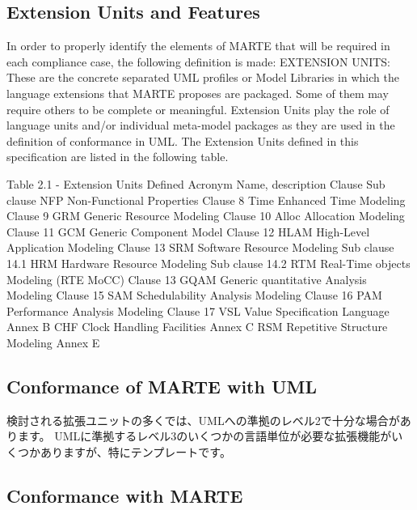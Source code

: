 \subsection{Extension Units and Features}

In order to properly identify the elements of MARTE that will be required in each compliance case, the following
definition is made:
EXTENSION UNITS: These are the concrete separated UML profiles or Model Libraries in which the language
extensions that MARTE proposes are packaged. Some of them may require others to be complete or meaningful.
Extension Units play the role of language units and/or individual meta-model packages as they are used in the
definition of conformance in UML.
The Extension Units defined in this specification are listed in the following table.

Table 2.1 - Extension Units Defined
Acronym Name, description Clause
Sub clause
NFP Non-Functional Properties Clause 8
Time Enhanced Time Modeling Clause 9
GRM Generic Resource Modeling Clause 10
Alloc Allocation Modeling Clause 11
GCM Generic Component Model Clause 12
HLAM High-Level Application Modeling Clause 13
SRM Software Resource Modeling Sub clause 14.1
HRM Hardware Resource Modeling Sub clause 14.2
RTM Real-Time objects Modeling (RTE MoCC) Clause 13
GQAM Generic quantitative Analysis Modeling Clause 15
SAM Schedulability Analysis Modeling Clause 16
PAM Performance Analysis Modeling Clause 17
VSL Value Specification Language Annex B
CHF Clock Handling Facilities Annex C
RSM Repetitive Structure Modeling Annex E

\subsection{Conformance of MARTE with UML}


検討される拡張ユニットの多くでは、UMLへの準拠のレベル2で十分な場合があります。 UMLに準拠するレベル3のいくつかの言語単位が必要な拡張機能がいくつかありますが、特にテンプレートです。

\subsection{Conformance with MARTE}

